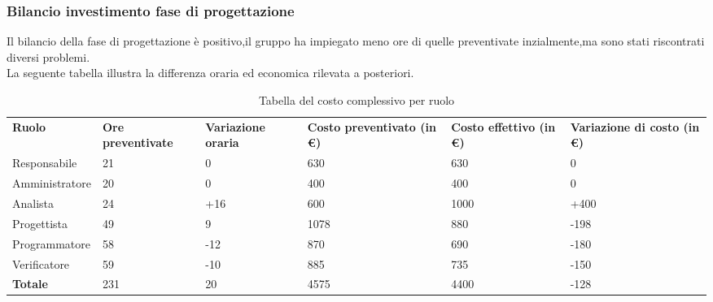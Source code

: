 \subsubsection{Bilancio investimento fase di progettazione}
Il bilancio della fase di progettazione è positivo,il gruppo ha impiegato meno ore di quelle preventivate inzialmente,ma sono stati riscontrati diversi problemi.\\
La seguente tabella illustra la differenza oraria ed economica rilevata a posteriori.
{
\renewcommand{\arraystretch}{2}
\begin{longtable}[h]{ C{2.5cm} C{2cm} C{1.8cm} C{2.2cm} C{1.5cm} C{2.3cm}}
\caption{Tabella del costo complessivo per ruolo}\\
\rowcolor{\primaryColor}

\textcolor{\secondaryColor}{\textbf{Ruolo}} & 
\textcolor{\secondaryColor}{\textbf{Ore preventivate}} & 
\textcolor{\secondaryColor}{\textbf{Variazione oraria}} & 
\textcolor{\secondaryColor}{\textbf{Costo preventivato (in \euro{})}} & 
\textcolor{\secondaryColor}{\textbf{Costo effettivo (in \euro{})}} & 
\textcolor{\secondaryColor}{\textbf{Variazione di costo (in \euro{})}}\\	
	
Responsabile    &  21 & 0 & 630 & 630 &  0 \\
Amministratore  &  20 & 0 & 400 & 400 & 0 \\
Analista        & 24 & +16 & 600 & 1000 & +400 \\
Progettista     &  49 & 9 & 1078 & 880 & -198 \\
Programmatore   &   58 & -12 & 870 &  690 & -180 \\
Verificatore    &  59 &  -10 & 885 & 735 & -150 \\
\textbf{Totale} & 231 & 20 & 4575 & 4400 & -128 \\	

\end{longtable}
}

